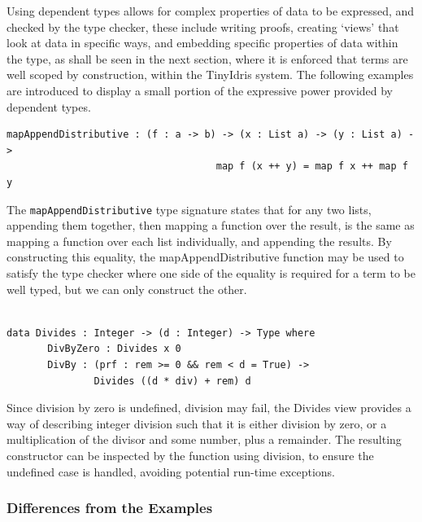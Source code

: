 \documentclass[a4paper]{article}
\begin{document}
Using dependent types allows for complex properties of data to be 
expressed, and checked by the type checker, these include writing
proofs, creating `views' that look at data in specific ways,
and embedding specific properties of data within the type, as shall be 
seen in the next section, where it is enforced that terms are well 
scoped by construction, within the TinyIdris system. The following
examples are introduced to display a small portion of the expressive
power provided by dependent types.

\begin{center}
\begin{verbatim}
mapAppendDistributive : (f : a -> b) -> (x : List a) -> (y : List a) ->
						            map f (x ++ y) = map f x ++ map f y
\end{verbatim}
\end{center}

The \texttt{mapAppendDistributive} type signature states that for any
two lists, appending them together, then mapping a function over the
result, is the same as mapping a function over each list individually,
and appending the results. By constructing this equality, the
mapAppendDistributive function may be used to satisfy the type checker
where one side of the equality is required for a term to be well typed,
but we can only construct the other.

\begin{center}
\begin{verbatim}

data Divides : Integer -> (d : Integer) -> Type where
	   DivByZero : Divides x 0
	   DivBy : (prf : rem >= 0 && rem < d = True) ->
			   Divides ((d * div) + rem) d
\end{verbatim}
\end{center}

Since division by zero is undefined, division may fail, the Divides
view provides a way of describing integer division such that it
is either division by zero, or a multiplication of the divisor and some
number, plus a remainder. The resulting constructor can be inspected by
the function using division, to ensure the undefined case is handled,
avoiding potential run-time exceptions.

\subsubsection{Differences from the Examples}
\label{sec:orgcd8bb18}
\end{document}
